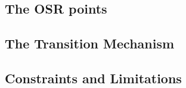 \subsection{The OSR points}
\subsection{The Transition Mechanism}

\subsection{Constraints and Limitations}
